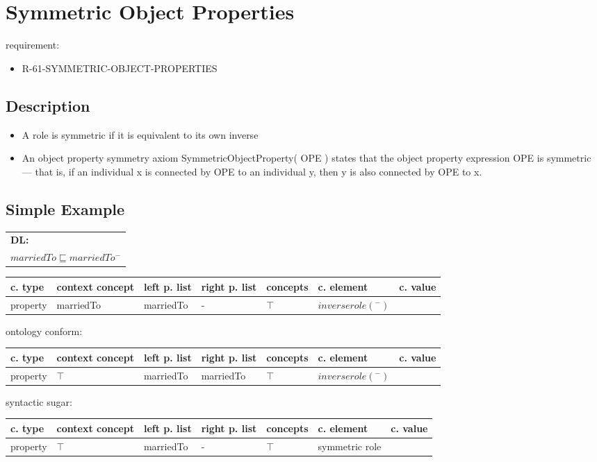 \documentclass{llncs}
\newenvironment{gcotable}{
  \scriptsize
  \sffamily
  \vspace{0.3cm}
  \begin{tabular}{l|l|l|l|l|l|l}
  \hline
  \textbf{c. type} & \textbf{context concept} & \textbf{left p. list} & \textbf{right p. list} & \textbf{concepts} & \textbf{c. element} & \textbf{c. value} \\
  \hline

}{
  \hline
  \end{tabular}
  \linebreak
}
\newenvironment{DL}{
  \scriptsize
  \sffamily
  \vspace{0.3cm}
  \begin{tabular}{l}
	\textbf{DL:} \\

}{
  \end{tabular}
  \linebreak
}
\begin{document}
\section{Symmetric Object Properties}

requirement:

\begin{itemize}
	\item R-61-SYMMETRIC-OBJECT-PROPERTIES
\end{itemize}

\subsection{Description}

\begin{itemize}
	\item A role is symmetric if it is equivalent to its own inverse \cite{Kroetzsch2012}
  \item An object property symmetry axiom SymmetricObjectProperty( OPE ) states that the object property expression OPE is symmetric — that is, if an individual x is connected by OPE to an individual y, then y is also connected by OPE to x. 	
\end{itemize}

\subsection{Simple Example}

\begin{DL}
$marriedTo \sqsubseteq marriedTo^{-}$ \\
\end{DL}

\begin{gcotable}
property & marriedTo & marriedTo & - & $\top$ & $inverse role (^{-})$ \\
\end{gcotable}

ontology conform:

\begin{gcotable}
property & $\top$ & marriedTo & marriedTo & $\top$ & $inverse role (^{-})$ \\
\end{gcotable}

syntactic sugar:

\begin{gcotable}
property & $\top$ & marriedTo & - & $\top$ & symmetric role \\
\end{gcotable}
\end{document}
